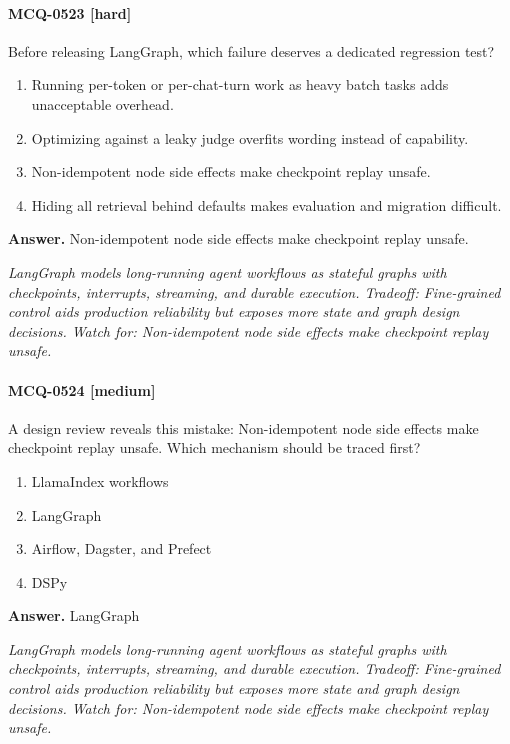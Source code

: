 \paragraph{MCQ-0523 [hard]} Before releasing LangGraph, which failure deserves a dedicated regression test?
\begin{enumerate}[label=\Alph*.]
\item Running per-token or per-chat-turn work as heavy batch tasks adds unacceptable overhead.
\item Optimizing against a leaky judge overfits wording instead of capability.
\item Non-idempotent node side effects make checkpoint replay unsafe.
\item Hiding all retrieval behind defaults makes evaluation and migration difficult.
\end{enumerate}
\noindent\textbf{Answer.} Non-idempotent node side effects make checkpoint replay unsafe.
\par\textit{LangGraph models long-running agent workflows as stateful graphs with checkpoints, interrupts, streaming, and durable execution. Tradeoff: Fine-grained control aids production reliability but exposes more state and graph design decisions. Watch for: Non-idempotent node side effects make checkpoint replay unsafe.}
\paragraph{MCQ-0524 [medium]} A design review reveals this mistake: Non-idempotent node side effects make checkpoint replay unsafe. Which mechanism should be traced first?
\begin{enumerate}[label=\Alph*.]
\item LlamaIndex workflows
\item LangGraph
\item Airflow, Dagster, and Prefect
\item DSPy
\end{enumerate}
\noindent\textbf{Answer.} LangGraph
\par\textit{LangGraph models long-running agent workflows as stateful graphs with checkpoints, interrupts, streaming, and durable execution. Tradeoff: Fine-grained control aids production reliability but exposes more state and graph design decisions. Watch for: Non-idempotent node side effects make checkpoint replay unsafe.}
